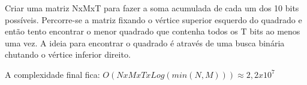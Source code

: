 Criar uma matriz NxMxT para fazer a soma acumulada de cada um dos 10 bits possíveis.
Percorre-se a matriz fixando o vértice superior esquerdo do quadrado e então tento
encontrar o menor quadrado que contenha todos os T bits ao menos uma vez.
A ideia para encontrar o quadrado é através de uma busca binária chutando o vértice inferior direito.

A complexidade final fica: $O(NxMxTxLog(min(N, M)))  \approx 2,2 x 10^7$
